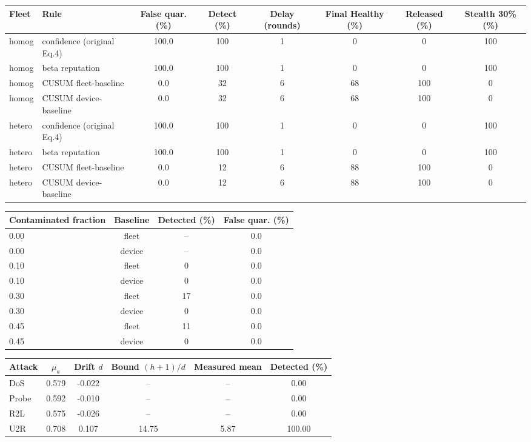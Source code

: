 \begin{tabular}{llcccccc}
\toprule
Fleet & Rule & False quar. (\%) & Detect (\%) & Delay (rounds) & Final Healthy (\%) & Released (\%) & Stealth 30\% (\%) \\
\midrule
homog & confidence (original Eq.4) & 100.0 & 100 & 1 & 0 & 0 & 100 \\
homog & beta reputation & 100.0 & 100 & 1 & 0 & 0 & 100 \\
homog & CUSUM fleet-baseline & 0.0 & 32 & 6 & 68 & 100 & 0 \\
homog & CUSUM device-baseline & 0.0 & 32 & 6 & 68 & 100 & 0 \\
hetero & confidence (original Eq.4) & 100.0 & 100 & 1 & 0 & 0 & 100 \\
hetero & beta reputation & 100.0 & 100 & 1 & 0 & 0 & 100 \\
hetero & CUSUM fleet-baseline & 0.0 & 12 & 6 & 88 & 100 & 0 \\
hetero & CUSUM device-baseline & 0.0 & 12 & 6 & 88 & 100 & 0 \\
\bottomrule
\end{tabular}

\begin{tabular}{lccc}
\toprule
Contaminated fraction & Baseline & Detected (\%) & False quar. (\%) \\
\midrule
0.00 & fleet & -- & 0.0 \\
0.00 & device & -- & 0.0 \\
0.10 & fleet & 0 & 0.0 \\
0.10 & device & 0 & 0.0 \\
0.30 & fleet & 17 & 0.0 \\
0.30 & device & 0 & 0.0 \\
0.45 & fleet & 11 & 0.0 \\
0.45 & device & 0 & 0.0 \\
\bottomrule
\end{tabular}

\begin{tabular}{lccccc}
\toprule
Attack & $\mu_a$ & Drift $d$ & Bound $(h+1)/d$ & Measured mean & Detected (\%) \\
\midrule
DoS & 0.579 & -0.022 & -- & -- & 0.00 \\
Probe & 0.592 & -0.010 & -- & -- & 0.00 \\
R2L & 0.575 & -0.026 & -- & -- & 0.00 \\
U2R & 0.708 & 0.107 & 14.75 & 5.87 & 100.00 \\
\bottomrule
\end{tabular}

